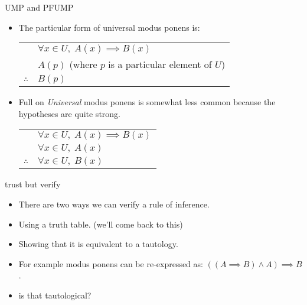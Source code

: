 \documentclass[landscape]{beamer}
\begin{document}
\begin{frame}{UMP and PFUMP}
\begin{itemize}
\item The particular form of universal modus ponens is: \pause \newline

\begin{center}
\begin{tabular}{cl}
 & $ \forall x \in U, \; A(x) \implies B(x)$ \\
 & $A(p)$ (where $p$ is a particular element of $U$) \\ \hline
$\therefore$ & $B(p)$\\
\end{tabular}
\end{center}

\pause

\item Full on {\em Universal} modus ponens is somewhat less common because the hypotheses are quite strong. \pause

\begin{center}
\begin{tabular}{cl}
 & $ \forall x \in U, \; A(x) \implies B(x)$ \\
 & $ \forall x \in U, \; A(x)$  \\ \hline
$\therefore$ & $\forall x \in U, \; B(x)$\\
\end{tabular}
\end{center}

\end{itemize}
\end{frame}

\begin{frame}{trust but verify}
\begin{itemize}
\item There are two ways we can verify a rule of inference. \pause
\item Using a truth table. \pause (we'll come back to this\textellipsis) \pause
\item Showing that it is equivalent to a tautology. \pause
\item For example modus ponens can be re-expressed as: \pause \newline
$ ( (A \implies B) \land A ) \implies B $. \pause
\item is that tautological?
\end{itemize}
\end{frame}
\end{document}
